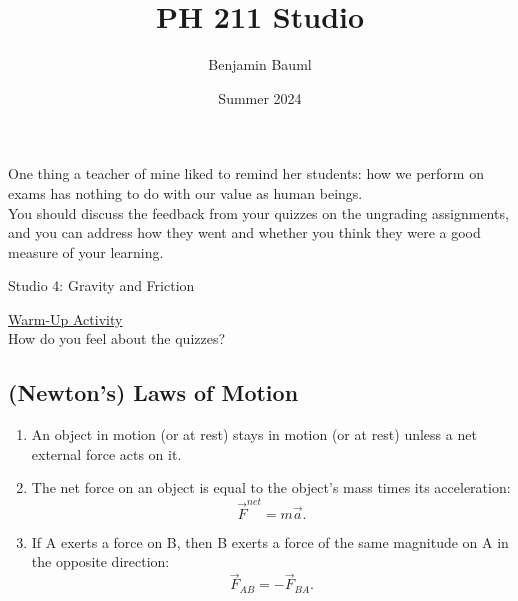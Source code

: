\documentclass[]{article}
\title{PH 211 Studio \Week}
\author{Benjamin Bauml}
\date{Summer 2024}
\begin{document}
\begin{TeacherMargin}
\noindent One thing a teacher of mine liked to remind her students: how we perform on exams has nothing to do with our value as human beings. \\

\noindent You should discuss the feedback from your quizzes on the ungrading assignments, and you can address how they went and whether you think they were a good measure of your learning.
\end{TeacherMargin}
\begin{PresentSpace}
\begin{center}
	\huge Studio 4: Gravity and Friction \\
	\vspace{1cm}
\end{center}
\underline{Warm-Up Activity} \\
How do you feel about the quizzes? \\
\begin{center}
\end{center}
\end{PresentSpace}
\newpage
\begin{TeacherMargin}

\end{TeacherMargin}
\begin{PresentSpace}
\vspace{-10pt}
\section*{(Newton's) Laws of Motion}
\vspace{-10pt}
\begin{enumerate}[(1)]
	\item An object in motion (or at rest) stays in motion (or at rest) unless a net external force acts on it.
	\item The net force on an object is equal to the object's mass times its acceleration:
	\[
	\vec{F}^{net} = m\vec{a}.
	\]
	\item If A exerts a force on B, then B exerts a force of the same magnitude on A in the opposite direction:
	\[
	\vec{F}_{AB} = -\vec{F}_{BA}.
	\]
\end{enumerate}
\end{PresentSpace}
\end{document}
